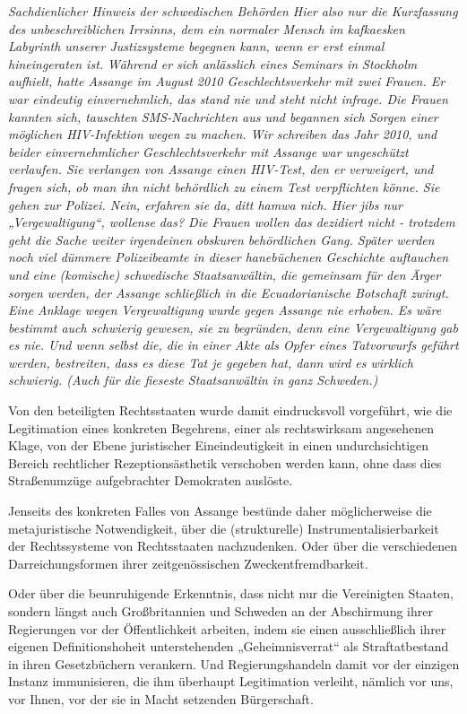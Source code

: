 \begin{multicols}{2}
\textit{Sachdienlicher Hinweis der schwedischen Behörden \linebreak
Hier also nur die Kurzfassung des unbeschreiblichen Irrsinns, dem ein normaler Mensch im kafkaesken Labyrinth unserer Justizsysteme begegnen kann, wenn er erst
einmal hineingeraten ist. Während er sich anlässlich
eines Seminars in Stockholm aufhielt, hatte Assange im
August 2010 Geschlechtsverkehr mit zwei Frauen. Er war
eindeutig einvernehmlich, das stand nie und steht nicht
infrage. Die Frauen kannten sich, tauschten SMS-Nachrichten aus und begannen sich Sorgen einer möglichen
HIV-Infektion wegen zu machen. Wir schreiben das Jahr
2010, und beider einvernehmlicher Geschlechtsverkehr
mit Assange war ungeschützt verlaufen. Sie verlangen
von Assange einen HIV-Test, den er verweigert, und fragen
sich, ob man ihn nicht behördlich zu einem Test verpflichten könne. Sie gehen zur Polizei. Nein, erfahren sie da, ditt
hamwa nich. Hier jibs nur „Vergewaltigung“, wollense
das? Die Frauen wollen das dezidiert nicht - trotzdem
geht die Sache weiter irgendeinen obskuren behördlichen
Gang. Später werden noch viel dümmere Polizeibeamte
in dieser hanebüchenen Geschichte auftauchen und eine
(komische) schwedische Staatsanwältin, die gemeinsam
für den Ärger sorgen werden, der Assange schließlich in
die Ecuadorianische Botschaft zwingt. Eine Anklage wegen Vergewaltigung wurde gegen Assange nie erhoben. Es
wäre bestimmt auch schwierig gewesen, sie zu begründen,
denn eine Vergewaltigung gab es nie. Und wenn selbst die,
die in einer Akte als Opfer eines Tatvorwurfs geführt werden, bestreiten, dass es diese Tat je gegeben hat, dann wird
es wirklich schwierig. (Auch für die fieseste Staatsanwältin in ganz Schweden.)}

Von den beteiligten Rechtsstaaten wurde damit eindrucksvoll vorgeführt, wie die Legitimation eines konkreten Begehrens, einer als rechtswirksam angesehenen
Klage, von der Ebene juristischer Eineindeutigkeit in
einen undurchsichtigen Bereich rechtlicher Rezeptionsästhetik verschoben werden kann, ohne dass dies Straßenumzüge aufgebrachter Demokraten auslöste.

Jenseits des konkreten Falles von Assange bestünde
daher möglicherweise die metajuristische Notwendigkeit, über die (strukturelle) Instrumentalisierbarkeit der
Rechtssysteme von Rechtsstaaten nachzudenken. Oder
über die verschiedenen Darreichungsformen ihrer zeitgenössischen Zweckentfremdbarkeit.

Oder über die beunruhigende Erkenntnis, dass nicht
nur die Vereinigten Staaten, sondern längst auch Großbritannien und Schweden an der Abschirmung ihrer
Regierungen vor der Öffentlichkeit arbeiten, indem sie
einen ausschließlich ihrer eigenen Definitionshoheit
unterstehenden „Geheimnisverrat“ als Straftatbestand
in ihren Gesetzbüchern verankern. Und Regierungshandeln damit vor der einzigen Instanz immunisieren, die
ihm überhaupt Legitimation verleiht, nämlich vor uns,
vor Ihnen, vor der sie in Macht setzenden Bürgerschaft.


\end{multicols}

